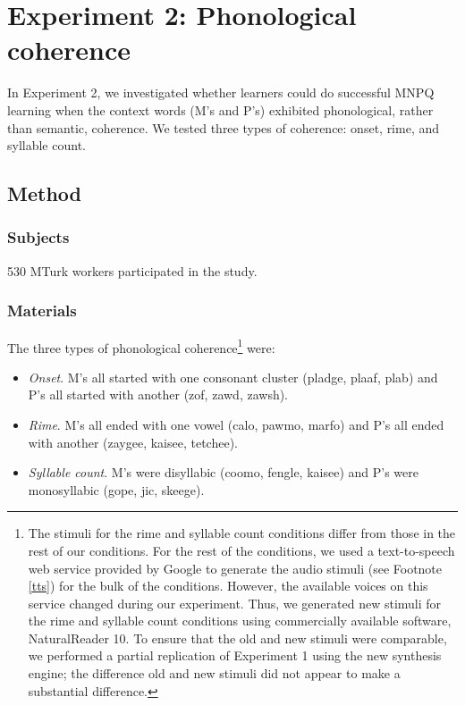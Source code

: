 \documentclass[man,floatsintext]{apa6}
\begin{document}
\section{Experiment 2: Phonological coherence}

In Experiment 2, we investigated whether learners could do successful
MNPQ learning when the context words (M's and P's) exhibited
phonological, rather than semantic, coherence. We tested three types
of coherence: onset, rime, and syllable count.

\subsection{Method}
\subsubsection{Subjects} 530 MTurk workers participated in the study.
\subsubsection{Materials}
The three types of phonological
coherence\footnote{\label{change-of-stimuli} The stimuli for the rime
  and syllable count conditions differ from those in the rest of our
  conditions. For the rest of the conditions, we used a text-to-speech
  web service provided by Google to generate the audio stimuli (see
  Footnote \ref{tts}) for the bulk of the conditions. However, the
  available voices on this service changed during our
  experiment. Thus, we generated new stimuli for the rime and syllable
  count conditions using commercially available software,
  NaturalReader 10. To ensure that the old and new stimuli were
  comparable, we performed a partial replication of Experiment 1 using
  the new synthesis engine; the difference old and new stimuli did not
  appear to make a substantial difference.} were:
\begin{itemize}
\item \emph{Onset}. M's all started with one consonant cluster
  (pladge, plaaf, plab) and P's all started with another (zof, zawd,
  zawsh).
\item \emph{Rime}. M's all ended with one vowel (calo, pawmo, marfo)
  and P's all ended with another (zaygee, kaisee, tetchee).
\item \emph{Syllable count}. M's were disyllabic (coomo, fengle,
  kaisee) and P's were monosyllabic (gope, jic, skeege).
\end{itemize}
\end{document}
